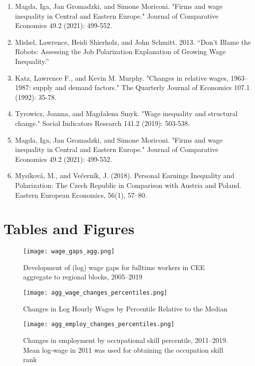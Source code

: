\documentclass{article}
\begin{document}
\begin{enumerate}
\item Magda, Iga, Jan Gromadzki, and Simone Moriconi. "Firms and wage inequality in Central and Eastern Europe." Journal of Comparative Economics 49.2 (2021): 499-552.

\item Mishel, Lawrence, Heidi Shierholz, and John Schmitt. 2013. “Don’t Blame the Robots: Assessing the Job Polarization Explanation of Growing Wage Inequality.”

\item Katz, Lawrence F., and Kevin M. Murphy. "Changes in relative wages, 1963–1987: supply and demand factors." The Quarterly Journal of Economics 107.1 (1992): 35-78.

\item Tyrowicz, Joanna, and Magdalena Smyk. "Wage inequality and structural change." Social Indicators Research 141.2 (2019): 503-538.

\item Magda, Iga, Jan Gromadzki, and Simone Moriconi. "Firms and wage inequality in Central and Eastern Europe." Journal of Comparative Economics 49.2 (2021): 499-552.

\item Mysíková, M., and Večerník, J. (2018). Personal Earnings Inequality and Polarization: The Czech Republic in Comparison with Austria and Poland. Eastern European Economics, 56(1), 57–80.

\end{enumerate}
\section{Tables and Figures}


\begin{figure}[!htbp]%
    \centering
    {\texttt{[image: wage\_gaps\_agg.png]} }
    \caption{Development of (log) wage gaps for fulltime workers in CEE aggregate to regional blocks,  2005–2019}
    \label{agg_wage_gaps_CEE}
\end{figure}


\begin{figure}[!htbp]%
    \centering
    {\texttt{[image: agg\_wage\_changes\_percentiles.png]} }
    \caption{Changes in Log Hourly Wages by Percentile Relative to the Median}
    \label{agg_wage_changes_percentiles}
\end{figure}



\begin{figure}[!htbp]%
    \centering
    {\texttt{[image: agg\_employ\_changes\_percentiles.png]} }
    \caption{Changes in employment by occupational skill percentile, 2011–2019. Mean log-wage in 2011 was used for obtaining the occupation skill rank}
    \label{agg_employ_changes_percentiles}
\end{figure}
\end{document}
